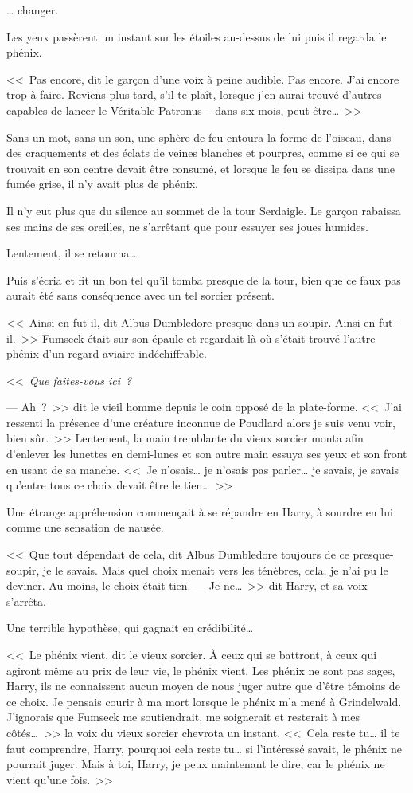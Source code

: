 … changer.

Les yeux passèrent un instant sur les étoiles au-dessus de lui puis il regarda le phénix.

<<~Pas encore, dit le garçon d'une voix à peine audible. Pas encore. J'ai encore trop à faire. Reviens plus tard, s'il te plaît, lorsque j'en aurai trouvé d'autres capables de lancer le Véritable Patronus -- dans six mois, peut-être…~>>

Sans un mot, sans un son, une sphère de feu entoura la forme de l'oiseau, dans des craquements et des éclats de veines blanches et pourpres, comme si ce qui se trouvait en son centre devait être consumé, et lorsque le feu se dissipa dans une fumée grise, il n'y avait plus de phénix.

Il n'y eut plus que du silence au sommet de la tour Serdaigle. Le garçon rabaissa ses mains de ses oreilles, ne s'arrêtant que pour essuyer ses joues humides.

Lentement, il se retourna…

Puis s'écria et fit un bon tel qu'il tomba presque de la tour, bien que ce faux pas aurait été sans conséquence avec un tel sorcier présent.

<<~Ainsi en fut-il, dit Albus Dumbledore presque dans un soupir. Ainsi en fut-il.~>> Fumseck était sur son épaule et regardait là où s'était trouvé l'autre phénix d'un regard aviaire indéchiffrable.

<<~\emph{Que faites-vous ici~? }

---  Ah~?~>> dit le vieil homme depuis le coin opposé de la plate-forme. <<~J'ai ressenti la présence d'une créature inconnue de Poudlard alors je suis venu voir, bien sûr.~>> Lentement, la main tremblante du vieux sorcier monta afin d'enlever les lunettes en demi-lunes et son autre main essuya ses yeux et son front en usant de sa manche. <<~Je n'osais… je n'osais pas parler… je savais, je savais qu'entre tous ce choix devait être le tien…~>>

Une étrange appréhension commençait à se répandre en Harry, à sourdre en lui comme une sensation de nausée.

<<~Que tout dépendait de cela, dit Albus Dumbledore toujours de ce presque-soupir, je le savais. Mais quel choix menait vers les ténèbres, cela, je n'ai pu le deviner. Au moins, le choix était tien.
---  Je ne…~>> dit Harry, et sa voix s'arrêta.

Une terrible hypothèse, qui gagnait en crédibilité…

<<~Le phénix vient, dit le vieux sorcier. À ceux qui se battront, à ceux qui agiront même au prix de leur vie, le phénix vient. Les phénix ne sont pas sages, Harry, ils ne connaissent aucun moyen de nous juger autre que d'être témoins de ce choix. Je pensais courir à ma mort lorsque le phénix m'a mené à Grindelwald. J'ignorais que Fumseck me soutiendrait, me soignerait et resterait à mes côtés…~>> la voix du vieux sorcier chevrota un instant. <<~Cela reste tu… il te faut comprendre, Harry, pourquoi cela reste tu… si l'intéressé savait, le phénix ne pourrait juger. Mais à toi, Harry, je peux maintenant le dire, car le phénix ne vient qu'une fois.~>>

